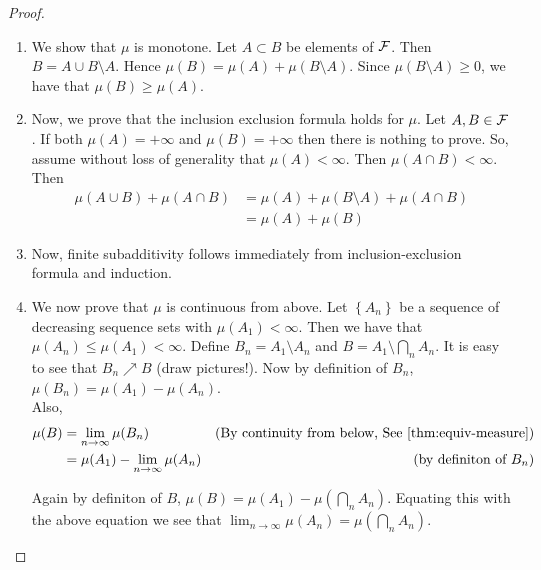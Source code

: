 \begin{proof}
    \begin{enumerate}[label=(\arabic*)]
        \item We show that $\mu$ is monotone. Let $A \subset B$ be elements of ${\cal F}$. Then $B=A\cup B\setminus A$. Hence $\mu (B) = \mu (A) + \mu (B\setminus A)$. Since $\mu (B\setminus A ) \ge 0$, we have that $\mu (B) \ge \mu (A)$. 

        \item Now, we prove that the inclusion exclusion formula holds for $\mu$. Let $A, B\in {\cal F}$. If both $\mu(A) = +\infty$ and $\mu (B) = + \infty$ then there is nothing to prove. So, assume without loss of generality that $\mu (A) < \infty$. Then $\mu (A \cap B) < \infty$.  Then
        \begin{align*}
            \mu (A \cup B) + \mu (A\cap B) &= \mu (A) + \mu (B \setminus A) + \mu (A \cap B)  \\
            &= \mu (A) + \mu (B)
        \end{align*}

        \item Now, finite subadditivity follows immediately from inclusion-exclusion formula and induction.

        \item We now prove that $\mu$ is continuous from above. Let $\left\{ A_n \right\}$ be a sequence of decreasing sequence sets with $\mu (A_1) < \infty$. Then we have that $\mu (A_n) \le \mu (A_1) < \infty$. Define $B_n = A_1 \setminus A_n$ and $B=A_1 \setminus \bigcap_n A_n$. It is easy to see that $B_n \nearrow B$ (draw pictures!). %
        Now by definition of $B_n$, $\mu (B_n ) = \mu (A_1) - \mu (A_n )$. \\
        Also, 
        \begin{align*}
            \mu (B)    &= \lim_{n \to \infty} \mu (B_n) & \text{(By continuity from below, See } \ref{thm:equiv-measure}) \\ 
                       &= \mu (A_1) - \lim_{n \to \infty} \mu (A_n) & \text{(by definiton of } B_n) \\
        \end{align*}

        Again by definiton of $B$, $\mu (B) = \mu (A_1) - \mu (\bigcap_n A_n )$. Equating this with the above equation we see that $\lim_{n \to \infty} \mu (A_n ) = \mu \left( \bigcap_n A_n \right)$. 


\end{enumerate}
\end{proof}

